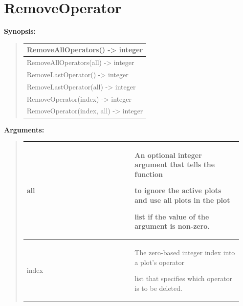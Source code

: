 \documentclass[letterpaper,10pt,english]{sphinxmanual}
\begin{document}
\section{RemoveOperator}
\label{functions:removeoperator}
\begin{DUlineblock}{0em}
\item[] \textbf{Synopsis:}
\end{DUlineblock}
\begin{quote}

\begin{tabulary}{\linewidth}{|L|}
\hline

RemoveAllOperators() -\textgreater{} integer
\\
\hline
RemoveAllOperators(all) -\textgreater{} integer
\\
\hline
RemoveLastOperator() -\textgreater{} integer
\\
\hline
RemoveLastOperator(all) -\textgreater{} integer
\\
\hline
RemoveOperator(index) -\textgreater{} integer
\\
\hline
RemoveOperator(index, all) -\textgreater{} integer
\\
\hline\end{tabulary}

\end{quote}

\begin{DUlineblock}{0em}
\item[] 
\item[] \textbf{Arguments:}
\end{DUlineblock}
\begin{quote}

\begin{tabular}{|p{0.475\linewidth}|p{0.475\linewidth}|}
\hline

all
 & 
\begin{DUlineblock}{0em}
\item[] An optional integer argument that tells the function
\item[] to ignore the active plots and use all plots in the plot
\item[] list if the value of the argument is non-zero.
\end{DUlineblock}
\\
\hline
index
 & 
\begin{DUlineblock}{0em}
\item[] The zero-based integer index into a plot's operator
\item[] list that specifies which operator is to be deleted.
\end{DUlineblock}
\\
\hline\end{tabular}

\end{quote}
\end{document}
